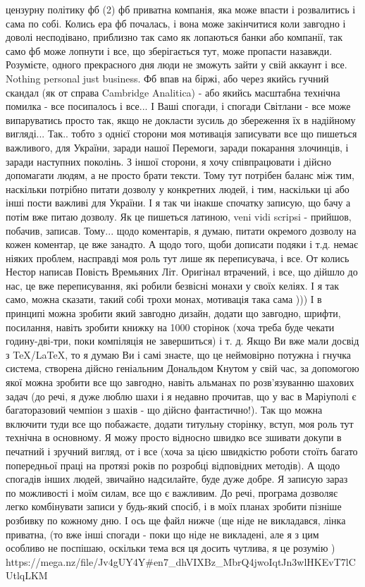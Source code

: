цензурну політику фб (2) фб приватна компанія, яка може впасти і розвалитись і
сама по собі. Колись ера фб почалась, і вона може закінчитися коли завгодно і
доволі несподівано, приблизно так само як лопаються банки або компанії, так
само фб може лопнути і все, що
зберігається тут, може пропасти назавжди. Розумієте, одного прекрасного дня
люди не зможуть зайти у свій аккаунт і все. Nothing personal just business. Фб
впав на біржі, або через якийсь гучний скандал (як от справа Cambridge
Analitica) - або якийсь масштабна технічна помилка - все посипалось і все...  І
Ваші спогади, і спогади Світлани - все може випаруватись просто так, якщо не
докласти зусиль до збереження їх в надійному вигляді...  Так.. тобто з однієї
сторони моя мотивація записувати все що пишеться важливого, для України, заради
нашої Перемоги, заради покарання злочинців, і заради наступних поколінь.  З
іншої сторони, я хочу співпрацювати і дійсно допомагати людям, а не просто
брати тексти. Тому тут потрібен баланс між тим, наскільки потрібно питати
дозволу у конкретних людей, і тим, наскільки ці або інші пости важливі для
України. І я так чи інакше спочатку записую, що бачу а потім вже питаю дозволу.
Як це пишеться латиною, veni vidi scripsi - прийшов, побачив, записав. Тому...
щодо коментарів, я думаю, питати окремого дозволу на кожен коментар, це вже
занадто. А щодо того, щоби дописати подяки і т.д. немає ніяких проблем,
насправді моя роль тут лише як переписувача, і все. От колись Нестор написав
Повість Времьяних Літ.  Оригінал втрачений, і все, що дійшло до нас, це вже
переписування, які робили безвісні монахи у своїх келіях. І я так само, можна
сказати, такий собі трохи монах, мотивація така сама )))  І в принципі можна
зробити який завгодно дизайн, додати що завгодно, шрифти, посилання, навіть
зробити книжку на 1000 сторінок (хоча треба буде чекати годину-дві-три, поки
компіляція не завершиться) і т. д.  Якщо Ви вже мали досвід з TeX/LaTeX, то я
думаю Ви і самі знаєте, що це неймовірно потужна і гнучка система, створена
дійсно геніальним Дональдом Кнутом у свій час, за допомогою якої можна зробити
все що завгодно, навіть альманах по розв'язуванню шахових задач (до речі, я дуже люблю шахи 
і я недавно прочитав, що у вас в Маріуполі є багаторазовий чемпіон з шахів - що
дійсно фантастично!).  Так що можна включити туди все що побажаєте, додати
титульну сторінку, вступ, моя роль тут технічна в основному. Я можу просто
відносно швидко все зшивати докупи в печатний і зручний вигляд, от і все (хоча
за цією швидкістю роботи стоїть багато попередньої праці на протязі років по
розробці відповідних методів). А щодо спогадів інших людей, звичайно
надсилайте, буде дуже добре. Я записую зараз по можливості і моїм силам, все що
є важливим. До речі, програма дозволяє легко комбінувати записи у будь-який
спосіб, і в моїх планах зробити пізніше розбивку по кожному дню. І ось ще файл
нижче (ще ніде не викладався, лінка приватна, (то вже інші спогади - поки що
ніде не викладені, але я з цим особливо не поспішаю, оскільки тема вся ця
досить чутлива, я це розумію )
https://mega.nz/file/Jv4gUY4Y#en7_dhVIXBz_MbrQ4jwoIqtJn3wlHKEvT7lCUtlqLKM
